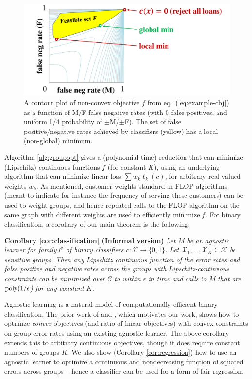 \documentclass[final, 12pt]{colt2018} %
\newcommand{\eps}{\epsilon}
\def\calC{\mathcal{C}}
\def\calX{\mathcal{X}}
\newcommand{\poly}{\mathop{\mbox{\text{poly}}}}
\begin{document}
\begin{figure}
\centering
\includegraphics[width=5in]{example.pdf}
\caption{A contour plot of non-convex objective $f$ from eq.~(\ref{eq:example-obj}) as a function of M/F false negative rates (with 0 false positives, and uniform 1/4 probability of $\pm$M/$\pm$F). The set of false positive/negative rates achieved by classifiers (yellow) has a local (non-global) minimum. 
\label{fig:example}}
\end{figure}

Algorithm \ref{alg:groupopt} gives a (polynomial-time) reduction that can minimize (Lipschitz) continuous functions $f$ (for constant $K$), using an underlying algorithm that can minimize linear loss $\sum w_k \ell_k(c)$, for arbitrary real-valued weights $w_k$. As mentioned, customer weights standard in FLOP algorithms (meant to indicate for instance the frequency of serving these customers) can be used to weight groups, and hence repeated calls to the FLOP algorithm on the same graph with different weights are used to efficiently minimize $f$. For binary classification, a corollary of our main theorem is the following:

\noindent
\textbf{Corollary \ref{cor:classification} (Informal version)} \textit{
Let $M$ be an agnostic learner for family $\calC$ of binary classifiers $c:\calX \rightarrow\{0,1\}$. Let $\calX_1, \ldots, \calX_K\subseteq \calX$ be sensitive groups. Then any Lipschitz continuous function of the error rates and false positive and negative rates across the groups with Lipschitz-continuous constraints can be minimized over $\calC$ to within $\eps$ in time and calls to $M$ that are $\poly(1/\eps$) for any constant $K$.}

\noindent
Agnostic learning \citep{Kearns:1992} is a natural model of computationally efficient binary classification. The prior work of \cite{NarasimhanRS015} and \cite{Agarwal17,Agarwal18}, which motivates our work, shows how to optimize {\em convex} objectives (and ratio-of-linear objectives) with convex constraints on group error rates using an existing agnostic learner. The above corollary extends this to arbitrary continuous objectives, though it does require constant numbers of groups $K$. We also show (Corollary \ref{cor:regression}) how to use an agnostic learner to optimize a continuous and nondecreasing function of squared errors across groups -- hence a classifier can be used for a form of fair regression. 
\end{document}
